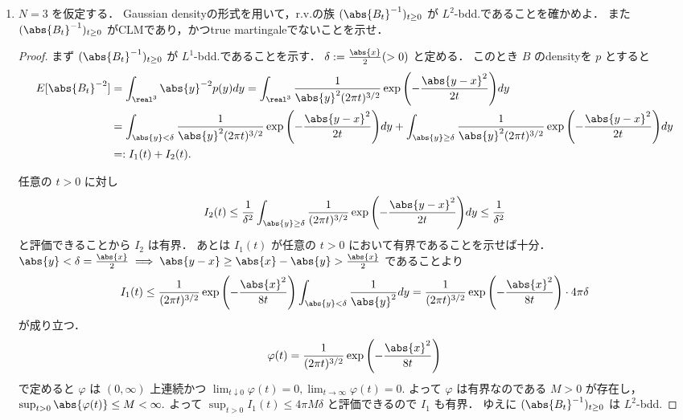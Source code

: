 \documentclass{jsarticle}
\begin{document}
\begin{enumerate}
\begin{proof}
        4.の結果より $\abs{B}^{2-N}$ は非負CLMなので，Prop. 4.7(i)より$\abs{B}^{2-N}$ は非負supermartingale.
        ゆえに任意の $t\ge0$ に対し
        $$
        E[\abs{B_t}^{2-N}]
        \le E[\abs{B_0}^{2-N}]
        = \abs{x}^{2-N}
        $$
        が成り立つので，$\sup_{t\ge0}E[\abs{B_t}^{2-N}]<\infty$ より $\abs{B}^{2-N}$ は $L^1$-bdd.
        よってThm. 3.19より $\abs{B_{\infty}}^{2-N}$ がa.s.で存在し0の値をとる（0にならないと仮定すると $\set{B_t}{t\ge0}$ が有限集合となり矛盾）．
        よってa.s.で $\lim_{t\to\infty}\abs{B_t}=\infty.$
    \end{proof}
    
    \item
    $N=3$ を仮定する．
    Gaussian densityの形式を用いて，r.v.の族 $(\abs{B_t}^{-1})_{t\ge0}$ が $L^2$-bdd.であることを確かめよ．
    また $(\abs{B_t}^{-1})_{t\ge0}$ がCLMであり，かつtrue martingaleでないことを示せ．
    \begin{proof}
        まず $(\abs{B_t}^{-1})_{t\ge0}$ が $L^1$-bdd.であることを示す．
        $\delta:=\frac{\abs{x}}{2}(>0)$ と定める．
        このとき $B$ のdensityを $p$ とすると
        \begin{align}
            E[\abs{B_t}^{-2}]
            &= \int_{\real^3}\abs{y}^{-2}p(y)dy
            = \int_{\real^3}\frac{1}{\abs{y}^2(2\pi t)^{3/2}}\exp{\left(-\frac{\abs{y-x}^2}{2t}\right)}dy \\
            &= \int_{\abs{y}<\delta}\frac{1}{\abs{y}^2(2\pi t)^{3/2}}\exp{\left(-\frac{\abs{y-x}^2}{2t}\right)}dy
            + \int_{\abs{y}\ge\delta}\frac{1}{\abs{y}^2(2\pi t)^{3/2}}\exp{\left(-\frac{\abs{y-x}^2}{2t}\right)}dy \\
            &=: I_1(t) + I_2(t).
        \end{align}

        任意の $t>0$ に対し
        \begin{align}
            I_2(t)
            \le \frac{1}{\delta^2}\int_{\abs{y}\ge\delta}\frac{1}{(2\pi t)^{3/2}}\exp{\left(-\frac{\abs{y-x}^2}{2t}\right)}dy
            \le \frac{1}{\delta^2}
        \end{align}
        と評価できることから $I_2$ は有界．
        あとは $I_1(t)$ が任意の $t>0$ において有界であることを示せば十分．
        $\abs{y}<\delta=\frac{\abs{x}}{2}\implies \abs{y-x}\ge\abs{x}-\abs{y}>\frac{\abs{x}}{2}$ であることより
        \begin{align}
            I_1(t)
            \le \frac{1}{(2\pi t)^{3/2}}\exp{\left(-\frac{\abs{x}^2}{8t}\right)}\int_{\abs{y}<\delta}\frac{1}{\abs{y}^2}dy
            = \frac{1}{(2\pi t)^{3/2}}\exp{\left(-\frac{\abs{x}^2}{8t}\right)}\cdot4\pi\delta
        \end{align}
        が成り立つ．
        $$
        \varphi(t)
        = \frac{1}{(2\pi t)^{3/2}}\exp{\left(-\frac{\abs{x}^2}{8t}\right)}
        $$
        で定めると $\varphi$ は $(0,\infty)$ 上連続かつ $\lim_{t\downarrow0}\varphi(t)=0, \lim_{t\to\infty}\varphi(t)=0.$
        よって $\varphi$ は有界なのである $M>0$ が存在し，$\sup_{t>0}\abs{\varphi(t)}\le M<\infty.$
        よって $\sup_{t>0}I_1(t)\le 4\pi M\delta$ と評価できるので $I_1$ も有界．
        ゆえに $(\abs{B_t}^{-1})_{t\ge0}$ は $L^2$-bdd.


\end{proof}
\end{enumerate}
\end{document}
